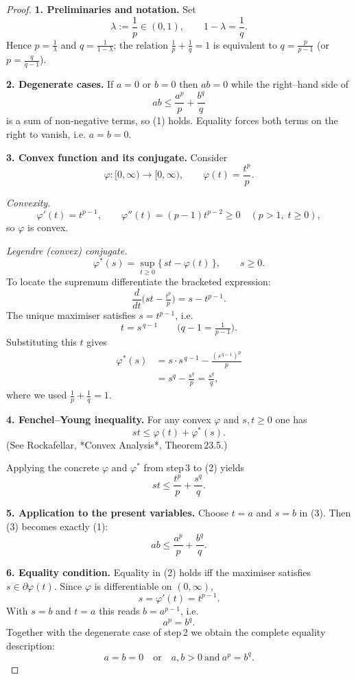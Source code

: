 \begin{proof}
\textbf{1. Preliminaries and notation.}  
Set  
\[
\lambda:=\frac1p\in(0,1),\qquad 1-\lambda=\frac1q .
\]
Hence \(p=\frac1\lambda\) and \(q=\frac1{1-\lambda}\); the relation \(\frac1p+\frac1q=1\) is equivalent to \(q=\frac{p}{p-1}\) (or \(p=\frac{q}{q-1}\)).

\medskip\noindent\textbf{2. Degenerate cases.}  
If \(a=0\) or \(b=0\) then \(ab=0\) while the right–hand side of  
\[
ab\le\frac{a^{p}}{p}+\frac{b^{q}}{q}
\tag{1}
\]
is a sum of non‑negative terms, so (1) holds. Equality forces both terms on the right to vanish, i.e. \(a=b=0\).

\medskip\noindent\textbf{3. Convex function and its conjugate.}  
Consider  
\[
\varphi:[0,\infty)\to[0,\infty),\qquad \varphi(t)=\frac{t^{p}}{p}.
\]

\textit{Convexity.}  
\[
\varphi'(t)=t^{p-1},\qquad 
\varphi''(t)=(p-1)t^{p-2}\ge0\quad(p>1,\;t\ge0),
\]
so \(\varphi\) is convex.

\textit{Legendre (convex) conjugate.}  
\[
\varphi^{*}(s)=\sup_{t\ge0}\bigl\{\,st-\varphi(t)\,\bigr\},
\qquad s\ge0 .
\]
To locate the supremum differentiate the bracketed expression:
\[
\frac{d}{dt}\bigl(st-\tfrac{t^{p}}{p}\bigr)=s-t^{p-1}.
\]
The unique maximiser satisfies \(s=t^{p-1}\), i.e.  
\[
t=s^{\,q-1}\qquad\bigl(q-1=\tfrac1{p-1}\bigr).
\]
Substituting this \(t\) gives
\[
\begin{aligned}
\varphi^{*}(s)
&=s\cdot s^{\,q-1}-\frac{(s^{\,q-1})^{p}}{p} \\
&=s^{q}-\frac{s^{q}}{p}
   =\frac{s^{q}}{q},
\end{aligned}
\]
where we used \(\frac1p+\frac1q=1\).

\medskip\noindent\textbf{4. Fenchel–Young inequality.}  
For any convex \(\varphi\) and \(s,t\ge0\) one has  
\[
st\le\varphi(t)+\varphi^{*}(s).
\tag{2}
\]
(See Rockafellar, *Convex Analysis*, Theorem 23.5.)

Applying the concrete \(\varphi\) and \(\varphi^{*}\) from step 3 to (2) yields
\[
st\le\frac{t^{p}}{p}+\frac{s^{q}}{q}.
\tag{3}
\]

\medskip\noindent\textbf{5. Application to the present variables.}  
Choose \(t=a\) and \(s=b\) in (3). Then (3) becomes exactly (1):
\[
ab\le\frac{a^{p}}{p}+\frac{b^{q}}{q}.
\]

\medskip\noindent\textbf{6. Equality condition.}  
Equality in (2) holds iff the maximiser satisfies \(s\in\partial\varphi(t)\).
Since \(\varphi\) is differentiable on \((0,\infty)\),
\[
s=\varphi'(t)=t^{p-1}.
\]
With \(s=b\) and \(t=a\) this reads \(b=a^{p-1}\), i.e.  
\[
a^{p}=b^{q}.
\tag{4}
\]
Together with the degenerate case of step 2 we obtain the complete equality
description:
\[
a=b=0\quad\text{or}\quad a,b>0\ \text{and}\ a^{p}=b^{q}.
\]


\end{proof}
